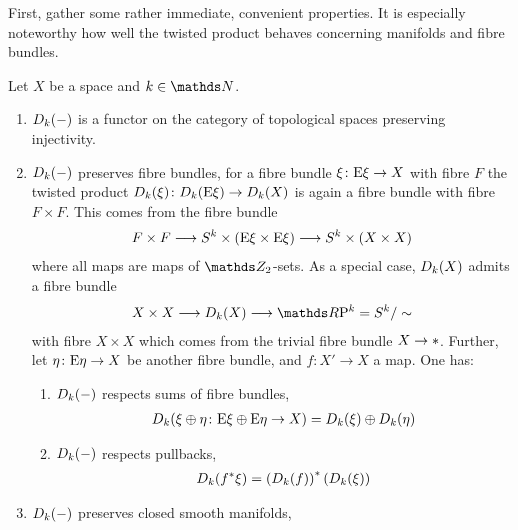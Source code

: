 First, gather some rather immediate, convenient properties. It is
especially noteworthy how well the twisted product behaves concerning
manifolds and fibre bundles.
\begin{Rem}\label{rem:twistedprodproperties}
  Let $X$ be a space and $k\in\Nat$.
  \begin{enumerate}
  \item $D_{k}({-})$ is a functor on the category of
    topological spaces preserving injectivity.
  \item\label{item:twistedprodfibrebdl}
    $D_{k}({-})$ preserves fibre bundles,
    \idest for a fibre bundle $\xi\colon\mathrm{E}\xi\to X$ with fibre $F$
    the twisted product $D_{k}({\xi})\colon
    D_{k}({\mathrm{E}\xi})\to D_{k}({X})$
    is again a fibre bundle with fibre $F\times F$.
    This comes from the fibre bundle
    \begin{gather*}
      F\times F
      \longrightarrow S^{k}\times(\mathrm{E}\xi\times \mathrm{E}\xi)
      \longrightarrow S^{k}\times(X\times X)
    \end{gather*}
    where all maps are maps of $\Zmod2$-sets.
    As a special case, $D_{k}({X})$ admits a fibre bundle
    \begin{gather}\label{eq:twistedprodrpnfibrebdl}
      X\times X
      \longto \Twistedprod{k}{X}
      \longto \RP k = \Sphere k/\sim
    \end{gather}
    with fibre $X\times X$ which comes from the trivial fibre bundle
    $X\to*$.
    Further, let $\eta\colon\mathrm{E}\eta\to X$ be
    another fibre bundle, and $f\colon X'\to X$ a map.
    One has:
    \begin{enumerate}
    \item $D_{k}({-})$ respects sums of fibre bundles, \idest
      \begin{gather*}
        D_{k}({\xi\oplus\eta\colon \mathrm{E}\xi\oplus\mathrm{E}\eta\to X})
        = D_{k}({\xi})\oplus D_{k}({\eta})
      \end{gather*}
    \item\label{item:twistedprod:preservespb}
      $D_{k}({-})$ respects pullbacks, \idest
      \begin{gather*}
        D_{k}({{f}^* \xi})
        = {\left(D_{k}({f})\right)}^*
        \left(D_{k}({\xi})\right)
      \end{gather*}
    \end{enumerate}
  \item\label{item:twistedprodmanifold}
    $D_{k}({-})$ preserves closed smooth manifolds, \idest

\end{enumerate}
\end{Rem}
